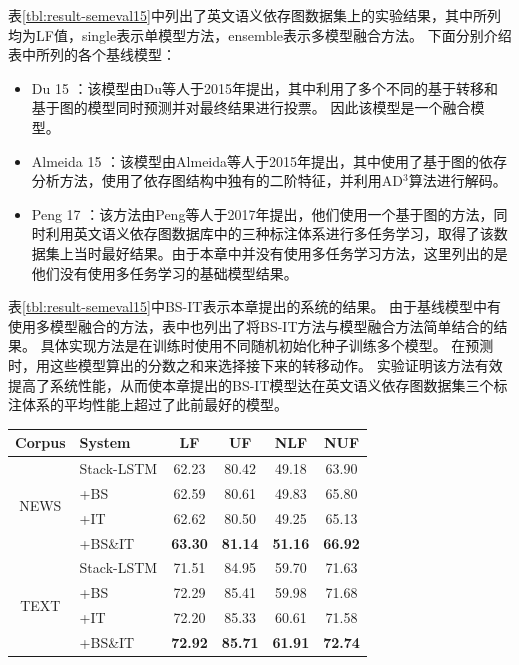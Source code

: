表\ref{tbl:result-semeval15}中列出了英文语义依存图数据集上的实验结果，其中所列均为LF值，single表示单模型方法，ensemble表示多模型融合方法。
下面分别介绍表中所列的各个基线模型：
\begin{itemize}
    \item Du 15 \cite{du-etal-2015-peking} ：该模型由Du等人于2015年提出，其中利用了多个不同的基于转移和基于图的模型同时预测并对最终结果进行投票。
    因此该模型是一个融合模型。
    \item Almeida 15 \cite{almeida-martins-2015-lisbon}：该模型由Almeida等人于2015年提出，其中使用了基于图的依存分析方法，使用了依存图结构中独有的二阶特征，并利用AD$^3$算法\cite{martins-etal-2011-dual}进行解码。
    \item Peng 17 \cite{peng-etal-2017-deep}：该方法由Peng等人于2017年提出，他们使用一个基于图的方法，同时利用英文语义依存图数据库中的三种标注体系进行多任务学习，取得了该数据集上当时最好结果。由于本章中并没有使用多任务学习方法，这里列出的是他们没有使用多任务学习的基础模型结果。
\end{itemize}

表\ref{tbl:result-semeval15}中BS-IT表示本章提出的系统的结果。
由于基线模型中有使用多模型融合的方法，表中也列出了将BS-IT方法与模型融合方法简单结合的结果。
具体实现方法是在训练时使用不同随机初始化种子训练多个模型。
在预测时，用这些模型算出的分数之和来选择接下来的转移动作。
实验证明该方法有效提高了系统性能，从而使本章提出的BS-IT模型达在英文语义依存图数据集三个标注体系的平均性能上超过了此前最好的模型。

\begin{table}[htpb]
    \vspace{0.5em}\centering\wuhao
	\begin{tabular}{clcccc}
		\toprule[1.5pt]
		Corpus& System & LF & UF & NLF & NUF\\
		\midrule[1pt]
		\multirow{4}{*}{NEWS}
		&Stack-LSTM&62.23&80.42&49.18&63.90\\
		&+BS &62.59&80.61&49.83&65.80\\
		&+IT &62.62&80.50&49.25&65.13\\
		&+BS\&IT &\bf63.30&\bf81.14&\bf51.16&\bf66.92\\
		\hline
		\multirow{4}{*}{TEXT}
		&Stack-LSTM&71.51&84.95&59.70&71.63\\
		&+BS &72.29&85.41&59.98&71.68\\
		&+IT &72.20&85.33&60.61&71.58\\
		&+BS\&IT &\bf72.92&\bf85.71&\bf61.91&\bf72.74\\
		\bottomrule[1.5pt]
	\end{tabular}
\end{table}

